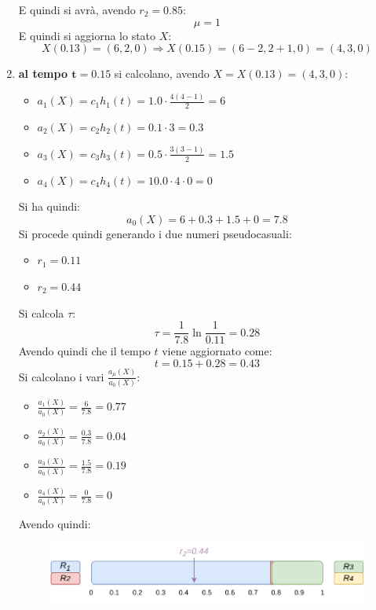\documentclass{article}
\begin{document}
\begin{enumerate}[label=\roman*)]
\begin{figure}[H]
  \end{figure}
  E quindi si avrà, avendo $r_2=0.85$:
  \[\mu=1\]
  E quindi si aggiorna lo stato $X$:
  \[X(0.13) = (6,2,0) \Rightarrow X(0.15) = (6-2,2+1,0) = (4,3,0)\]
  \newpage
  \item \textbf{al tempo $\mathbf{t=0.15}$} si calcolano, avendo
  $X=X(0.13)=(4,3,0)$: 
  \begin{multicols}{2}
    \begin{itemize}
      \item $a_1(X)=c_1h_1(t)=1.0\cdot\frac{4(4-1)}{2}=6$
      \item $a_2(X)=c_2h_2(t)=0.1\cdot 3=0.3$
      \item $a_3(X)=c_3h_3(t)=0.5\cdot \frac{3(3-1)}{2}=1.5$
      \item $a_4(X)=c_4h_4(t)=10.0\cdot 4 \cdot 0=0$
    \end{itemize}
  \end{multicols}
  Si ha quindi:
  \[a_0(X)=6+0.3+1.5+0=7.8\]
  Si procede quindi generando i due numeri pseudocasuali:
  \begin{multicols}{2}
    \begin{itemize}
      \item $r_1=0.11$
      \item $r_2=0.44$
    \end{itemize}
  \end{multicols}
  Si calcola $\tau$:
  \[\tau=\frac{1}{7.8}\ln\frac{1}{0.11}=0.28\]
  Avendo quindi che il tempo $t$ viene aggiornato come:
  \[t=0.15+0.28=0.43\]
  Si calcolano i vari $\frac{a_\mu(X)}{a_0(X)}$:
  \begin{multicols}{2}
    \begin{itemize}
      \item $\frac{a_1(X)}{a_0(X)}=\frac{6}{7.8}=0.77$
      \item $\frac{a_2(X)}{a_0(X)}=\frac{0.3}{7.8}=0.04$
      \item $\frac{a_3(X)}{a_0(X)}=\frac{1.5}{7.8}=0.19$
      \item $\frac{a_4(X)}{a_0(X)}=\frac{0}{7.8}=0$
    \end{itemize}
  \end{multicols}
  Avendo quindi:
  \begin{figure}[H]
    \centering
    \includegraphics[scale = 0.8]{img/t4.pdf}

\end{figure}
\end{enumerate}
\end{document}
